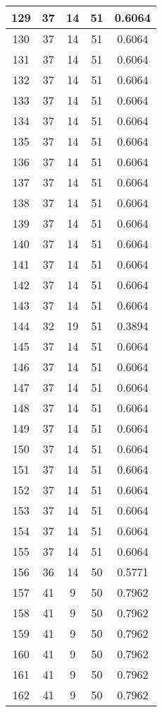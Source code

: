 \documentclass[letterpaper, 12pt]{article}
\begin{document}
\begin{longtable}{|c|c|c|c|c|}
\hline
129 & 37 & 14 & 51 & 0.6064 \\
\hline
130 & 37 & 14 & 51 & 0.6064 \\
\hline
131 & 37 & 14 & 51 & 0.6064 \\
\hline
132 & 37 & 14 & 51 & 0.6064 \\
\hline
133 & 37 & 14 & 51 & 0.6064 \\
\hline
134 & 37 & 14 & 51 & 0.6064 \\
\hline
135 & 37 & 14 & 51 & 0.6064 \\
\hline
136 & 37 & 14 & 51 & 0.6064 \\
\hline
137 & 37 & 14 & 51 & 0.6064 \\
\hline
138 & 37 & 14 & 51 & 0.6064 \\
\hline
139 & 37 & 14 & 51 & 0.6064 \\
\hline
140 & 37 & 14 & 51 & 0.6064 \\
\hline
141 & 37 & 14 & 51 & 0.6064 \\
\hline
142 & 37 & 14 & 51 & 0.6064 \\
\hline
143 & 37 & 14 & 51 & 0.6064 \\
\hline
144 & 32 & 19 & 51 & 0.3894 \\
\hline
145 & 37 & 14 & 51 & 0.6064 \\
\hline
146 & 37 & 14 & 51 & 0.6064 \\
\hline
147 & 37 & 14 & 51 & 0.6064 \\
\hline
148 & 37 & 14 & 51 & 0.6064 \\
\hline
149 & 37 & 14 & 51 & 0.6064 \\
\hline
150 & 37 & 14 & 51 & 0.6064 \\
\hline
151 & 37 & 14 & 51 & 0.6064 \\
\hline
152 & 37 & 14 & 51 & 0.6064 \\
\hline
153 & 37 & 14 & 51 & 0.6064 \\
\hline
154 & 37 & 14 & 51 & 0.6064 \\
\hline
155 & 37 & 14 & 51 & 0.6064 \\
\hline
156 & 36 & 14 & 50 & 0.5771 \\
\hline
157 & 41 & 9 & 50 & 0.7962 \\
\hline
158 & 41 & 9 & 50 & 0.7962 \\
\hline
159 & 41 & 9 & 50 & 0.7962 \\
\hline
160 & 41 & 9 & 50 & 0.7962 \\
\hline
161 & 41 & 9 & 50 & 0.7962 \\
\hline
162 & 41 & 9 & 50 & 0.7962 \\

\end{longtable}
\end{document}
